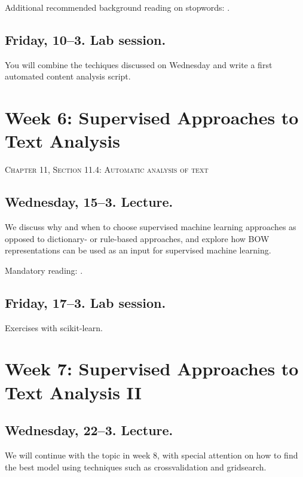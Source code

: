 Additional recommended background reading on stopwords: \cite{Nothman2018}.


\subsection*{Friday, 10--3. Lab session.}
You will combine the techiques discussed on Wednesday and write a first automated content analysis script.








\section*{Week 6: Supervised Approaches to Text Analysis}
\textsc{ Chapter 11, Section 11.4: Automatic analysis of text}\\


\subsection*{Wednesday, 15--3. Lecture.}
We discuss why and when to choose supervised machine learning approaches as opposed to dictionary- or rule-based approaches, and explore how BOW representations can be used as an input for supervised machine learning.

Mandatory reading: \cite{Boumans2016}.


\subsection*{Friday, 17--3. Lab session.}
Exercises with scikit-learn.





\section*{Week 7: Supervised Approaches to Text Analysis II}


\subsection*{Wednesday, 22--3. Lecture.}
We will continue with the topic in week 8, with special attention on how to find the best model using techniques such as crossvalidation and gridsearch.

